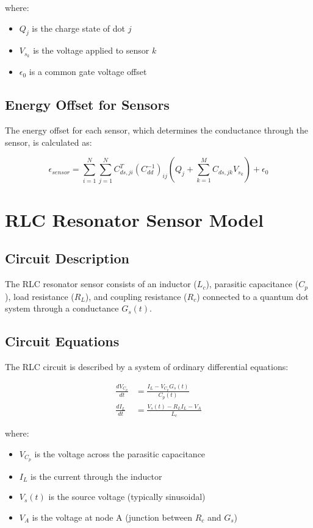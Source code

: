\documentclass[11pt,a4paper]{article}
\begin{document}
where:
\begin{itemize}
\item $Q_j$ is the charge state of dot $j$
\item $V_{s_k}$ is the voltage applied to sensor $k$
\item $\epsilon_0$ is a common gate voltage offset
\end{itemize}

\subsection{Energy Offset for Sensors}

The energy offset for each sensor, which determines the conductance through the sensor, is calculated as:

\begin{equation}
\epsilon_{sensor} = \sum_{i=1}^{N} \sum_{j=1}^{N} C_{ds,ji}^T (C_{dd}^{-1})_{ij} \left( Q_j + \sum_{k=1}^{M} C_{ds,jk} V_{s_k} \right) + \epsilon_0
\end{equation}

\section{RLC Resonator Sensor Model}

\subsection{Circuit Description}

The RLC resonator sensor consists of an inductor ($L_c$), parasitic capacitance ($C_p$), load resistance ($R_L$), and coupling resistance ($R_c$) connected to a quantum dot system through a conductance $G_s(t)$.

\subsection{Circuit Equations}

The RLC circuit is described by a system of ordinary differential equations:

\begin{align}
\frac{dV_{C_p}}{dt} &= \frac{I_L - V_{C_p} G_s(t)}{C_p(t)} \\
\frac{dI_L}{dt} &= \frac{V_s(t) - R_L I_L - V_A}{L_c}
\end{align}

where:
\begin{itemize}
\item $V_{C_p}$ is the voltage across the parasitic capacitance
\item $I_L$ is the current through the inductor
\item $V_s(t)$ is the source voltage (typically sinusoidal)
\item $V_A$ is the voltage at node A (junction between $R_c$ and $G_s$)
\end{itemize}
\end{document}
